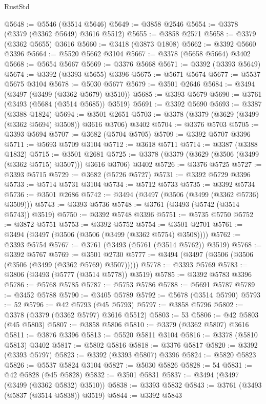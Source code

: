 \begin{lexlean}{RustStd}
\begin{coremodule}
@5648 := @5546 (@3514 @5646)
@5649 := @3858 @2546
@5654 := @3378 (@3379 (@3362 @5649) @3616 @5512)
@5655 := @3858 @2571
@5658 := @3379 (@3362 @5655) @3616
@5660 := @3418 (@3873 @1808)
@5662 := @3392 @5660 @3396
@5664 := @5520 @5662 @3104
@5667 := @3378 (@5658 @5664) @3402
@5668 := @5654 @5667
@5669 := @3376 @5668
@5671 := @3392 (@3393 @5649)
@5674 := @3392 (@3393 @5655) @3396
@5675 := @5671 @5674
@5677 := @5537 @5675 @3104
@5678 := @5030 @5677
@5679 := @3501 @2646
@5684 := @3494 (@3497 (@3499 (@3362 @5679) @3510))
@5685 := @3393 @5679
@5690 := @3761 (@3493 (@5684 (@3514 @5685)) @3519)
@5691 := @3392 @5690
@5693 := @3387 (@3388 @1824)
@5694 := @3501 @2651
@5703 := @3378 (@3379 (@3629 (@3499 (@3362 @5694) @3508)) @3616 @3706) @3402
@5704 := @3376 @5703
@5705 := @3393 @5694
@5707 := @3682 (@5704 @5705)
@5709 := @3392 @5707 @3396
@5711 := @5693 @5709 @3104
@5712 := @3618 @5711
@5714 := @3387 (@3388 @1832)
@5715 := @3501 @2681
@5725 := @3378 (@3379 (@3629 (@3506 (@3499 (@3362 @5715) @3507))) @3616 @3706) @3402
@5726 := @3376 @5725
@5727 := @3393 @5715
@5729 := @3682 (@5726 @5727)
@5731 := @3392 @5729 @3396
@5733 := @5714 @5731 @3104
@5734 := @5712 @5733
@5735 := @3392 @5734
@5736 := @3501 @2686
@5742 := @3494 (@3497 (@3506 (@3499 (@3362 @5736) @3509)))
@5743 := @3393 @5736
@5748 := @3761 (@3493 (@5742 (@3514 @5743)) @3519)
@5750 := @3392 @5748 @3396
@5751 := @5735 @5750
@5752 := @3872 @5751
@5753 := @3392 @5752
@5754 := @3501 @2701
@5761 := @3494 (@3497 (@3506 (@3506 (@3499 (@3362 @5754) @3508))))
@5762 := @3393 @5754
@5767 := @3761 (@3493 (@5761 (@3514 @5762)) @3519)
@5768 := @3392 @5767
@5769 := @3501 @2730
@5777 := @3494 (@3497 (@3506 (@3506 (@3506 (@3499 (@3362 @5769) @3507)))))
@5778 := @3393 @5769
@5783 := @3806 (@3493 (@5777 (@3514 @5778)) @3519)
@5785 := @3392 @5783 @3396
@5786 := @5768 @5785
@5787 := @5753 @5786
@5788 := @5691 @5787
@5789 := @3452 @5788
@5790 := @3405 @5789
@5792 := @5678 (@3514 @5790)
@5793 := 52
@5796 := @42 @5793 (@45 @5793)
@5797 := @3858 @5796
@5802 := @3378 (@3379 (@3362 @5797) @3616 @5512)
@5803 := 53
@5806 := @42 @5803 (@45 @5803)
@5807 := @3858 @5806
@5810 := @3379 (@3362 @5807) @3616
@5811 := @3876 @3396
@5813 := @5520 @5811 @3104
@5816 := @3378 (@5810 @5813) @3402
@5817 := @5802 @5816
@5818 := @3376 @5817
@5820 := @3392 (@3393 @5797)
@5823 := @3392 (@3393 @5807) @3396
@5824 := @5820 @5823
@5826 := @5537 @5824 @3104
@5827 := @5030 @5826
@5828 := 54
@5831 := @42 @5828 (@45 @5828)
@5832 := @3501 @5831
@5837 := @3494 (@3497 (@3499 (@3362 @5832) @3510))
@5838 := @3393 @5832
@5843 := @3761 (@3493 (@5837 (@3514 @5838)) @3519)
@5844 := @3392 @5843

\end{coremodule}
\end{lexlean}
